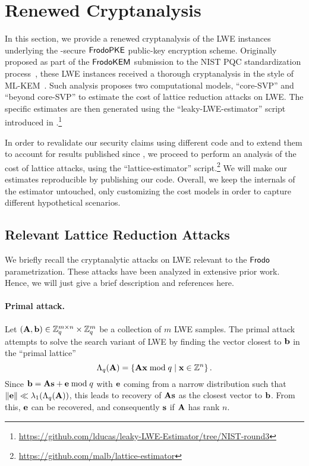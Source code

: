 \section{Renewed Cryptanalysis}

In this section, we provide a renewed cryptanalysis of the LWE instances underlying the \INDCPA-secure $\textsf{\upshape\mdseries FrodoPKE}$ public-key encryption scheme. 
Originally proposed as part of the $\textsf{\upshape\mdseries FrodoKEM}$ submission to the NIST PQC standardization process~\cite{NISTPQC-R3:FrodoKEM20}, these LWE instances received a thorough cryptanalysis in the style of ML-KEM~\cite{MLKEM,NISTPQC-R3:CRYSTALS-Kyber20}.
Such analysis proposes two computational models, ``core-SVP'' and ``beyond core-SVP'' to estimate the cost of lattice reduction attacks on LWE. The specific estimates are then generated using the ``leaky-LWE-estimator'' script introduced in \cite{dachman2020lwe}.\footnote{\url{https://github.com/lducas/leaky-LWE-Estimator/tree/NIST-round3}}

In order to revalidate our security claims using different code and to extend them to account for results published since \cite{NISTPQC-R3:FrodoKEM20}, we proceed to perform an analysis of the cost of lattice attacks, using the ``lattice-estimator'' script.\footnote{\url{https://github.com/malb/lattice-estimator}}
We will make our estimates reproducible by publishing our code. Overall, we keep the internals of the estimator untouched, only customizing the cost models in order to capture different hypothetical scenarios.

\subsection{Relevant Lattice Reduction Attacks}

We briefly recall the cryptanalytic attacks on LWE relevant to the $\textsf{\upshape\mdseries Frodo}$ parametrization. These attacks have been analyzed in extensive prior work. Hence, we will just give a brief description and references here.

\paragraph{Primal attack.}
Let $(\mathbf{A}, \mathbf{b}) \in \mathbb{Z}_q^{m \times n} \times \mathbb{Z}_q^m$ be a collection of $m$ LWE samples. The primal attack attempts to solve the search variant of LWE by finding the vector closest to $\mathbf{b}$ in the ``primal lattice''
\[
\Lambda_q(\mathbf{A}) = \left\{\mathbf{A} \mathbf{x} \bmod q \mid \mathbf{x} \in \mathbb{Z}^n \right\}.
\]
Since $\mathbf{b} = \mathbf{A} \mathbf{s} + \mathbf{e} \bmod q$ with $\mathbf{e}$ coming from a narrow distribution such that \mbox{$\lVert\mathbf{e}\rVert \ll \lambda_1(\Lambda_q(\mathbf{A}))$}, this leads to recovery of $\mathbf{A} \mathbf{s}$ as the closest vector to $\mathbf{b}$. From this, $\mathbf{e}$ can be recovered, and consequently $\mathbf{s}$ if $\mathbf{A}$ has rank $n$.

